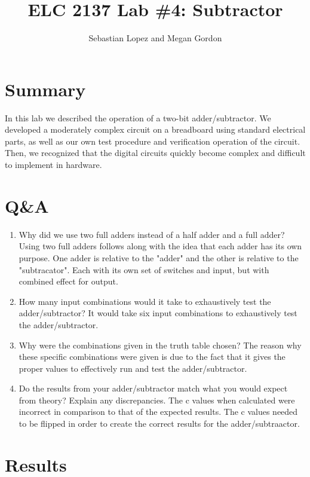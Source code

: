 \documentclass[11pt]{article}
\begin{document}
\title{ELC 2137 Lab \#4: Subtractor}
\author{Sebastian Lopez and Megan Gordon}

\maketitle


\section*{Summary}

In this lab we described the operation of a two-bit adder/subtractor. We developed a moderately complex circuit on a breadboard using standard electrical parts, as well as our own test procedure and verification operation of the circuit. Then, we recognized that the digital circuits quickly become complex and difficult to implement in hardware. 

\section*{Q\&A}

\begin{enumerate}
	\item Why did we use two full adders instead of a half adder and a full adder? 
	Using two full adders follows along with the idea that each adder has its own purpose. One adder is relative to the "adder" and the other is relative to the "subtracator". Each with its own set of switches and input, but with combined effect for output.   
	\item How many input combinations would it take to exhaustively test the adder/subtractor? 
	It would take six input combinations to exhaustively test the adder/subtractor.
	\item Why were the combinations given in the truth table chosen?
	The reason why these specific combinations were given is due to the fact that it gives the proper values to effectively run and test the adder/subtractor. 
	\item Do the results from your adder/subtractor match what you would expect from theory? Explain any discrepancies. 
	The c values when calculated were incorrect in comparison to that of the expected results. The c values needed to be flipped in order to create the correct results for the adder/subtraactor. 
	
\end{enumerate}

\section*{Results}
\end{document}
